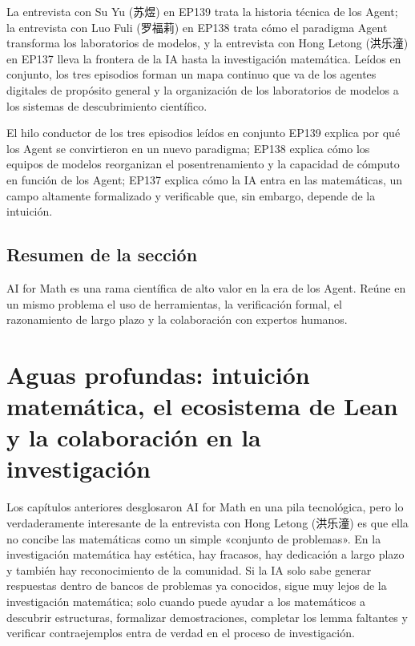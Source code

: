 \documentclass[a4paper]{article}
\begin{document}
La entrevista con Su Yu (苏煜) en EP139 trata la historia técnica de los Agent; la entrevista con Luo Fuli (罗福莉) en EP138 trata cómo el paradigma Agent transforma los laboratorios de modelos, y la entrevista con Hong Letong (洪乐潼) en EP137 lleva la frontera de la IA hasta la investigación matemática. Leídos en conjunto, los tres episodios forman un mapa continuo que va de los agentes digitales de propósito general y la organización de los laboratorios de modelos a los sistemas de descubrimiento científico.

\begin{importantbox}{El hilo conductor de los tres episodios leídos en conjunto}
EP139 explica por qué los Agent se convirtieron en un nuevo paradigma; EP138 explica cómo los equipos de modelos reorganizan el posentrenamiento y la capacidad de cómputo en función de los Agent; EP137 explica cómo la IA entra en las matemáticas, un campo altamente formalizado y verificable que, sin embargo, depende de la intuición.
\end{importantbox}

\subsection{Resumen de la sección}

AI for Math es una rama científica de alto valor en la era de los Agent. Reúne en un mismo problema el uso de herramientas, la verificación formal, el razonamiento de largo plazo y la colaboración con expertos humanos.
\section{Aguas profundas: intuición matemática, el ecosistema de Lean y la colaboración en la investigación}

Los capítulos anteriores desglosaron AI for Math en una pila tecnológica, pero lo verdaderamente interesante de la entrevista con Hong Letong (洪乐潼) es que ella no concibe las matemáticas como un simple «conjunto de problemas». En la investigación matemática hay estética, hay fracasos, hay dedicación a largo plazo y también hay reconocimiento de la comunidad. Si la IA solo sabe generar respuestas dentro de bancos de problemas ya conocidos, sigue muy lejos de la investigación matemática; solo cuando puede ayudar a los matemáticos a descubrir estructuras, formalizar demostraciones, completar los lemma faltantes y verificar contraejemplos entra de verdad en el proceso de investigación.
\end{document}
